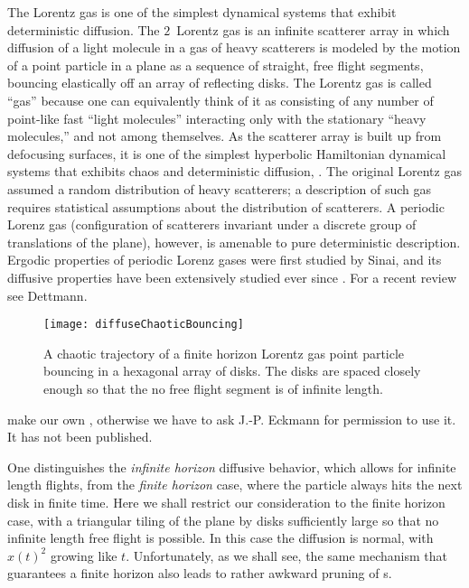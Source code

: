 The Lorentz gas is one of the simplest dynamical systems
that exhibit deterministic diffusion. The $2$\dmn\ Lorentz gas is an
infinite scatterer array in which diffusion of a light molecule in a gas
of heavy scatterers is modeled by the motion of a point particle in a
plane as a sequence of straight, free flight segments, bouncing
elastically off an array of reflecting disks. The Lorentz gas is called
``gas'' because one can equivalently think of it as consisting of any
number of point-like fast ``light molecules'' interacting only with the
stationary ``heavy molecules,'' and not among themselves.  As the
scatterer array is built up from defocusing surfaces, it is one of the
simplest hyperbolic Hamiltonian dynamical systems that exhibits chaos and
deterministic diffusion, .
The original Lorentz gas assumed a random distribution of
heavy scatterers; a description of such gas requires statistical
assumptions about the distribution of scatterers. A periodic Lorenz gas
(configuration of scatterers invariant under a discrete group of
translations of the plane), however, is amenable to pure deterministic
description. Ergodic properties of periodic Lorenz gases were first
studied by Sinai, and its diffusive properties have been
extensively studied ever since%
.
For a recent review  see Dettmann.

\begin{figure}[htbp]
	\begin{center}
		\texttt{[image: diffuseChaoticBouncing]}
	\end{center}
	\caption[]{\label{fig-chaoticBouncing}
		A chaotic trajectory of a finite horizon Lorentz gas
		point particle bouncing in a
		hexagonal array of disks. The disks are spaced closely enough
		so that the no free flight segment is of infinite length.
	}
\end{figure}
     {make our own , otherwise
	we have to ask J.-P. Eckmann for permission to use it. It has not been
	published.
    }

One distinguishes
the {\em infinite horizon} diffusive behavior, which allows for infinite
length flights, from
the {\em finite horizon} case, where the particle always
hits the next disk in finite time.
Here we shall restrict our consideration to the finite horizon case, with
a triangular tiling of the plane by disks sufficiently large so that no
infinite length free flight is possible. In this case the diffusion is
normal, with $\hat{x}(t)^2$ growing like $t$.
Unfortunately, as we shall see,
the same mechanism that guarantees a finite horizon
also leads to rather awkward pruning of \po s.


